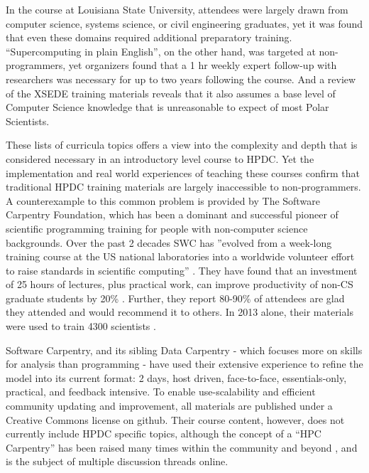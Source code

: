 \documentclass[conference]{IEEEtran}
\begin{document}
In the course at Louisiana State University, attendees were largely drawn from computer science, systems science, or civil engineering graduates, yet it was found that even these domains required additional preparatory training. “Supercomputing in plain English”, on the other hand, was targeted at non-programmers, yet organizers found that a 1 hr weekly expert follow-up with researchers was necessary for up to two years following the course.  And a review of the XSEDE training materials reveals that it also assumes a base level of Computer Science knowledge that is unreasonable to expect of most Polar Scientists.

These lists of curricula topics offers a view into the complexity and depth that is considered necessary in an introductory level course to HPDC. Yet the implementation and real world experiences of teaching these courses confirm that traditional HPDC training materials are largely inaccessible to non-programmers.
A counterexample to this common problem is provided by The Software Carpentry Foundation, which has been a dominant and successful pioneer of scientific programming training for people with non-computer science backgrounds. Over the past 2 decades SWC has ''evolved from a week-long training course at the US national laboratories into a worldwide volunteer effort to raise standards in scientific computing'' \cite{Wilson2014-pc}. They have found that an investment of 25 hours of lectures, plus practical work, can improve productivity of non-CS graduate students by 20\% \cite{Wilson_undated-yk}. Further, they report 80-90\% of attendees are glad they attended and would recommend it to others. In 2013 alone, their materials were used to train 4300 scientists \cite{Wilson2014-pc}.

Software Carpentry, and its sibling Data Carpentry\cite{Mimno2016-cw} - which focuses more on skills for analysis than programming - have used their extensive experience to refine the model into its current format: 2 days, host driven, face-to-face, essentials-only, practical, and feedback intensive. To enable use-scalability and efficient community updating and improvement, all materials are published under a Creative Commons license on github.  Their course content, however, does not currently include HPDC specific topics, although the concept of a “HPC Carpentry” has been raised many times within the community \cite{Datacarpentry_undated-zl} and beyond \cite{noauthor_undated-zw}, and is the subject of multiple discussion threads online. 
\end{document}
